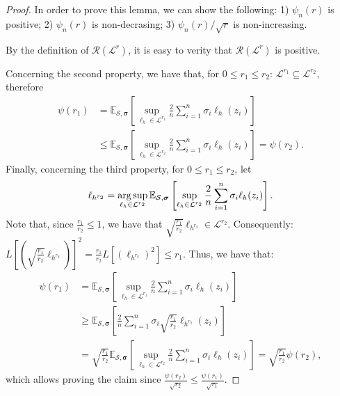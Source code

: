 \documentclass{article}
\newcommand{\argsup}{\operatornamewithlimits{arg\,sup}}
\begin{document}
\begin{proof}
  In order to prove this lemma, we can show the following:
    1) $\psi_n(r)$ is positive;
    2) $\psi_n(r)$ is non-decrasing;
    3) $\psi_n(r)/\sqrt{r}$ is non-increasing.

  By the definition of $\mathcal{R}(\mathcal{L}^r)$,
  it is easy to verity that $\mathcal{R}(\mathcal{L}^r)$ is positive.

  Concerning the second property, we have that, for $0\leq r_1\leq r_2$:
  $
    \mathcal{L}^{r_1}\subseteq \mathcal{L}^{r_2},
  $
  therefore
  \begin{align*}
    \psi(r_1)&=\mathbb{E}_{\mathcal{S},\bm \sigma}
      \left[\sup_{\ell_h\in\mathcal{L}^{r_1}}\frac{2}{n}
      \sum_{i=1}^{n}\sigma_i\ell_h(z_i)
          \right]\\
    &\leq \mathbb{E}_{\mathcal{S},\bm \sigma}
      \left[\sup_{\ell_h\in\mathcal{L}^{r_2}}\frac{2}{n}
      \sum_{i=1}^{n}\sigma_i\ell_h(z_i)
          \right]=\psi(r_2).
  \end{align*}
  Finally, concerning the third property,
  for $0\leq r_1\leq r_2$,
  let
  \begin{align*}
    \ell_{h^{r_2}}
    =\argsup_{\ell_h\in\mathcal{L}^{r_2}}
    \mathbb{E}_{\mathcal{S},\bm \sigma}
      \left[\sup_{\ell_h\in\mathcal{L}^{r_2}}\frac{2}{n}
      \sum_{i=1}^{n}\sigma_i\ell_h(z_i)
          \right].
  \end{align*}
  Note that, since $\frac{r_1}{r_2}\leq 1$,
  we have that $\sqrt{\frac{r_1}{r_2}}\ell_{h^{r_2}}\in \mathcal{L}^{r_2}$.
  Consequently:
  $
    L\left[
    \left(\sqrt{\frac{r_1}{r_2}}\ell_{h^{r_2}}\right)\right]^2
    =\frac{r_1}{r_2}L\left[(\ell_{h^{r_2}})^2\right]\leq r_1.
  $
  Thus, we have that:
  \begin{align*}
    \psi(r_1)&=\mathbb{E}_{\mathcal{S},\bm \sigma}
      \left[\sup_{\ell_h\in\mathcal{L}^{r_1}}\frac{2}{n}
      \sum_{i=1}^{n}\sigma_i\ell_h(z_i)
          \right]\\
    &\geq \mathbb{E}_{\mathcal{S},\bm \sigma}\left[
    \frac{2}{n}
      \sum_{i=1}^{n}
      \sigma_i\sqrt{\frac{r_1}{r_2}}\ell_{h^{r_2}}(z_i)\right]
  \\
    &=\sqrt{\frac{r_1}{r_2}}\mathbb{E}_{\mathcal{S},\bm \sigma}
      \left[\sup_{\ell_h\in\mathcal{L}^{r_2}}\frac{2}{n}
      \sum_{i=1}^{n}\sigma_i\ell_h(z_i)
          \right]
    =\sqrt{\frac{r_1}{r_2}}\psi(r_2),
  \end{align*}
  which allows proving the claim since
  $
    \frac{\psi(r_2)}{\sqrt{r_2}}
    \leq \frac{\psi(r_1)}{\sqrt{r_1}}.
  $
\end{proof}
\end{document}
